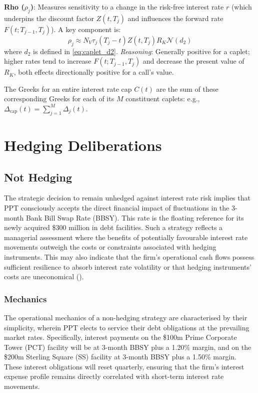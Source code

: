 \documentclass[11pt, a4paper, british]{article}
\begin{document}
\textbf{Rho ($\rho_j$)}: Measures sensitivity to a change in the risk-free interest rate $r$ (which underpins the discount factor $Z(t,T_j)$ and influences the forward rate $F(t; T_{j-1}, T_j)$). A key component is:
\begin{equation}
    \rho_j \approx N_V \tau_j (T_j-t) Z(t, T_j) R_K \mathcal{N}(d_2)
    \label{eq:caplet_rho_revised}
\end{equation}
where $d_2$ is defined in \eqref{eq:caplet_d2}.
\textit{Reasoning}: Generally positive for a caplet; higher rates tend to increase $F(t; T_{j-1}, T_j)$ and decrease the present value of $R_K$, both effects directionally positive for a call's value.

The Greeks for an entire interest rate cap $C(t)$ are the sum of these corresponding Greeks for each of its $M$ constituent caplets: e.g., $\Delta_{\text{cap}}(t) = \sum_{j=1}^{M} \Delta_j(t)$.

\newpage

\section{Hedging Deliberations}

\subsection{Not Hedging}
The strategic decision to remain unhedged against interest rate risk implies that PPT consciously accepts the direct financial impact of fluctuations in the 3-month Bank Bill Swap Rate (BBSY). This rate is the floating reference for its newly acquired \$300 million in debt facilities. Such a strategy reflects a managerial assessment where the benefits of potentially favourable interest rate movements outweigh the costs or constraints associated with hedging instruments. This may also indicate that the firm's operational cash flows possess sufficient resilience to absorb interest rate volatility or that hedging instruments' costs are uneconomical (\cite{sr}).
\subsubsection{Mechanics}
The operational mechanics of a non-hedging strategy are characterised by their simplicity, wherein PPT elects to service their debt obligations at the prevailing market rates. Specifically, interest payments on the \$100m Prime Corporate Tower (PCT) facility will be at 3-month BBSY plus a 1.20\% margin, and on the \$200m Sterling Square (SS) facility at 3-month BBSY plus a 1.50\% margin. These interest obligations will reset quarterly, ensuring that the firm's interest expense profile remains directly correlated with short-term interest rate movements.
\end{document}

